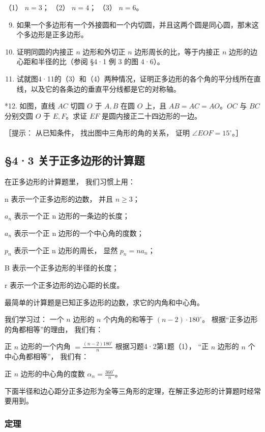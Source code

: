 （1） \(n = 3\)； （2） \(n = 4\)； （3） \(n = 6\)。

\begin{enumerate}
\setcounter{enumi}{8}
\item
  如果一个多边形有一个外接圆和一个内切圆，并且这两个圆是同心圆，那末这个多边形是正多边形。
\item
  证明同圆的内接正 \(n\) 边形和外切正 \(n\) 边形周长的比，等于内接正
  \(n\) 边形的边心距和半径的比（参阅 §4·1 例 3 的图 4·6）。
\item
  试就图4·11的（3）和（4）两种情况，证明正多边形的各个角的平分线所在直线，以及它的各条边的垂直平分线都是它的对称轴。
\end{enumerate}

*12. 如图，直线 \(AC\) 切圆 \(O\) 于 \(A, B\) 在圆 \(O\) 上，且
\(AB = AC = AO\)。\(OC\) 与 \(BC\) 分别交圆 \(O\) 于 \(E, F\)。求证
\(EF\) 是圆内接正二十四边形的一边。

［提示： 从已知条件， 找出图中三角形的角的关系， 证明
\(\angle EOF = 15^{\circ}\)。］

\subsection{§4·3
关于正多边形的计算题}

在正多边形的计算题里， 我们习惯上用：

n 表示一个正多边形的边数， 并且 \(n \geqslant 3\)；

\(a_{n}\) 表示一个正 n 边形的一条边的长度；

\(a_{n}\) 表示一个正 n 边形的一个中心角的度数；

\(p_{n}\) 表示一个正 n 边形的周长， 显然 \(p_{n}=na_{n}\)；

B 表示一个正多边形的半径的长度；

r 表示一个正多边形的边心距的长度。

最简单的计算题是已知正多边形的边数，求它的内角和中心角。

我们学习过： 一个 \(n\) 边形的 \(n\) 个内角的和等于
\((n - 2) \cdot 180^{\circ}\)。 根据``正多边形的角都相等''的理由，
我们有：

正 \(n\) 边形的一个内角 \(= \frac{(n - 2)180^{\circ}}{n}\)
根据习题4·2第1题（1）， ``正 \(n\) 边形的 \(n\) 个中心角都相等''，
我们有：

正 \(n\) 边形的中心角的度数 \(\alpha_{n} = \frac{360^{\circ}}{n}\)。

下面半径和边心距分正多边形为全等三角形的定理，在解正多边形的计算题时经常要用到。

\subsubsection{定理}

